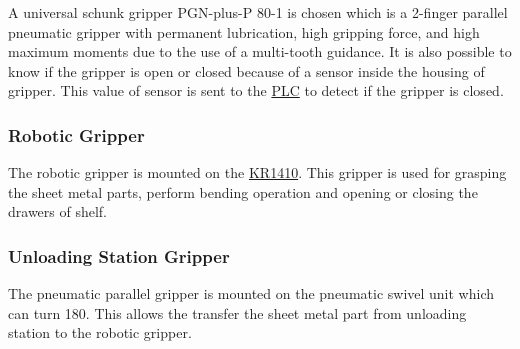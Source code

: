 A universal schunk gripper PGN-plus-P 80-1 is chosen which is a 
2-finger parallel pneumatic gripper with permanent lubrication, high gripping force, and high maximum moments due to the use of a multi-tooth guidance. \cite{schunk-gripper}
It is also possible to know if the gripper is open or closed because of a sensor inside the housing of gripper. This value of sensor is sent to the \hyperref[acro:PLC]{PLC} to detect if the gripper is closed.


\subsubsection{Robotic Gripper}
\label{subsubsec:robotic-gripper}
The robotic gripper is mounted on the \hyperref[acro:KR]{KR1410}. This gripper is used for grasping the sheet metal parts, perform bending operation and opening or closing the drawers of shelf.

\subsubsection{Unloading Station Gripper}
\label{subsubsec:unloading-gripper}
The pneumatic parallel gripper is mounted on the pneumatic swivel unit which can turn 180\textdegree. This allows the transfer the 
sheet metal part from unloading station to the robotic gripper.